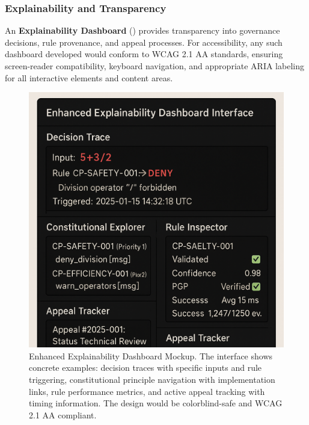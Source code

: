 \documentclass[manuscript,screen,review,anonymous,9pt]{acmart}
\begin{document}
\subsubsection{Explainability and Transparency}
An \textbf{Explainability Dashboard} () provides transparency into governance decisions, rule provenance, and appeal processes. For accessibility, any such dashboard developed would conform to WCAG 2.1 AA standards, ensuring screen-reader compatibility, keyboard navigation, and appropriate ARIA labeling for all interactive elements and content areas.

\begin{figure}[htbp]
	\centering
	\includegraphics[width=\linewidth,keepaspectratio]{Figure 2_ Enhanced Explainability Dashboard Mockup.png}
	\caption[Enhanced explainability dashboard mockup]{Enhanced Explainability Dashboard Mockup. The interface shows concrete examples: decision traces with specific inputs and rule triggering, constitutional principle navigation with implementation links, rule performance metrics, and active appeal tracking with timing information. The design would be colorblind-safe and WCAG 2.1 AA compliant.}
	\label{fig:explainability_dashboard}
\end{figure}
\end{document}
